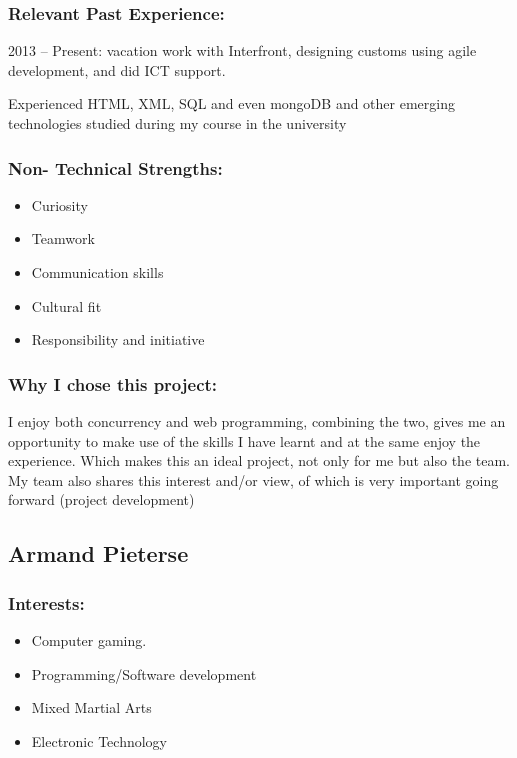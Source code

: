 \subsubsection{Relevant Past Experience:}
\par{2013 – Present: vacation work with Interfront, designing customs using agile development, and did ICT support.
}
\par{Experienced HTML, XML, SQL and even mongoDB and other emerging technologies studied during my course in the university
}
\subsubsection{Non- Technical Strengths:}
\begin{itemize}
		\item Curiosity
		\item Teamwork
		\item Communication skills
		\item Cultural fit
		\item Responsibility and initiative
	\end{itemize}
\subsubsection{Why I chose this project:}
\par{I enjoy both concurrency and web programming, combining the two, gives me an opportunity to make use of the skills I have learnt and at the same enjoy the experience. Which makes this an ideal project, not only for me but also the team. My team also shares this interest and/or view, of which is very important going forward (project development)
}

\newpage
\subsection{Armand Pieterse}
	
\subsubsection{Interests:}
	\begin{itemize}
		\item Computer gaming.
		\item Programming/Software development
		\item Mixed Martial Arts
		\item Electronic Technology
	\end{itemize}
		
